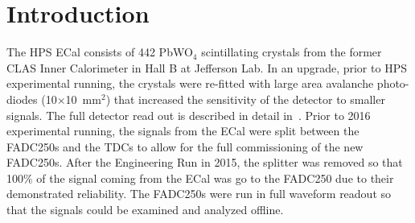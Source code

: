 \documentclass[twoside]{article}
\begin{document}
\section{Introduction}
The HPS ECal consists of 442 PbWO$_4$ scintillating crystals from the former CLAS Inner Calorimeter in Hall B at Jefferson Lab. In an upgrade, prior to HPS experimental running, the crystals were re-fitted with large area avalanche photo-diodes (10$\times$10~mm$^2$) that increased the sensitivity of the detector to smaller signals. The full detector read out is described in detail in~\cite{balossino_hps_2016}. Prior to 2016 experimental running, the signals from the ECal were split between the FADC250s and the TDCs to allow for the full commissioning of the new FADC250s. After the Engineering Run in 2015, the splitter was removed so that 100$\%$ of the signal coming from the ECal was go to the FADC250 due to their demonstrated reliability. The FADC250s were run in full waveform readout so that the signals could be examined and analyzed offline. 
\end{document}
